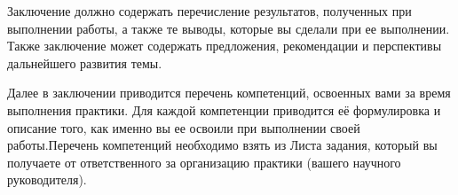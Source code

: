 \conclusion
Заключение должно содержать перечисление результатов, полученных при выполнении работы, а также те выводы, которые вы сделали при ее выполнении. Также заключение может содержать предложения, рекомендации и перспективы дальнейшего развития темы. 

Далее в заключении приводится перечень компетенций, освоенных вами за время выполнения практики. Для каждой компетенции приводится её формулировка и описание того, как именно вы ее освоили при выполнении своей работы.Перечень компетенций необходимо взять из Листа задания, который вы получаете от ответственного за организацию практики (вашего научного руководителя).